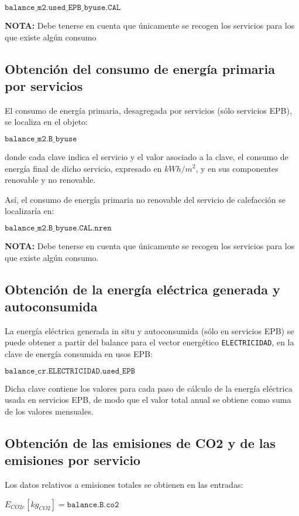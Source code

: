 \documentclass[10pt,notitlepage,oneside,a4paper]{article}
\begin{document}
$\texttt{balance\_m2.used\_EPB\_byuse.CAL}$

\textbf{NOTA:} Debe tenerse en cuenta que únicamente se recogen los servicios para los que existe algún consumo

\subsection{Obtención del consumo de energía primaria por servicios}

El consumo de energía primaria, desagregada por servicios (sólo servicios EPB), se localiza en el objeto:

$\texttt{balance\_m2.B\_byuse}$

donde cada clave indica el servicio y el valor asociado a la clave, el consumo de energía final de dicho servicio, expresado en $kWh/m^2$, y en sus componentes renovable y no renovable.

Así, el consumo de energía primaria no renovable del servicio de calefacción se localizaría en:

$\texttt{balance\_m2.B\_byuse.CAL.nren}$

\textbf{NOTA:} Debe tenerse en cuenta que únicamente se recogen los servicios para los que existe algún consumo.

\subsection{Obtención de la energía eléctrica generada y autoconsumida}

La energía eléctrica generada in situ y autoconsumida (sólo en servicios EPB) se puede obtener a partir del balance para el vector energético \texttt{ELECTRICIDAD}, en la clave de energía consumida en usos EPB:

$\texttt{balance\_cr.ELECTRICIDAD.used\_EPB}$

Dicha clave contiene los valores para cada paso de cálculo de la energía eléctrica usada en servicios EPB, de modo que el valor total anual se obtiene como suma de los valores mensuales.

\subsection{Obtención de las emisiones de CO2 y de las emisiones por servicio}

Los datos relativos a emisiones totales se obtienen en las entradas:

$E_{CO2e} [kg_{CO2}] = \texttt{balance.B.co2}$
\end{document}
